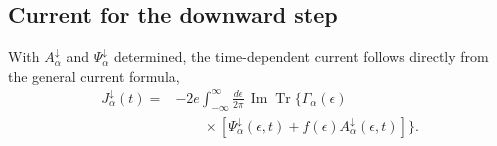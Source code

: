 \documentclass[
 reprint,
 superscriptaddress,
 amsmath,amssymb,
 aps,prb,
 longbibliography,
 floatfix
]{revtex4-2}
\begin{document}
\subsection{Current for the downward step}
\label{sec:down-current}

With $A_\alpha^\downarrow$ and $\Psi_\alpha^\downarrow$ determined, the time-dependent current follows directly from the general current formula,
\begin{equation}
\boxed{
\begin{aligned}
J_\alpha^\downarrow(t)
={}&
-2e
\int_{-\infty}^{\infty}
\frac{d\epsilon}{2\pi}\,
\operatorname{Im}
\operatorname{Tr}
\Bigg\{
\Gamma_\alpha(\epsilon)
\\
&\qquad\times
\left[
\Psi_\alpha^\downarrow(\epsilon,t)
+
f(\epsilon)
A_\alpha^\downarrow(\epsilon,t)
\right]
\Bigg\}.
\end{aligned}}
\label{eq:Jalpha-down-final}
\end{equation}
\end{document}
